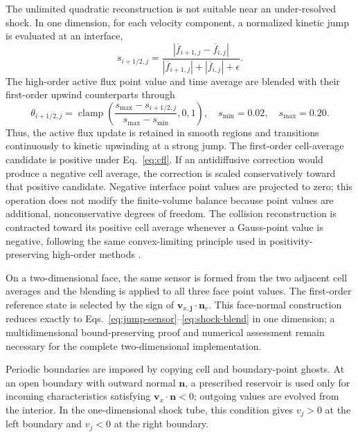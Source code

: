 \documentclass[preprint,3p,12pt]{elsarticle}
\newcommand{\vct}[1]{\boldsymbol{#1}}
\newcommand{\avg}[1]{\overline{#1}}
\begin{document}
The unlimited quadratic reconstruction is not suitable near an under-resolved shock. In one dimension, for each velocity component, a normalized kinetic jump is evaluated at an interface,
\begin{equation}
  s_{i+1/2,j}
  = \frac{|\avg{f}_{i+1,j}-\avg{f}_{i,j}|}
  {|\avg{f}_{i+1,j}|+|\avg{f}_{i,j}|+\epsilon}.
  \label{eq:jump-sensor}
\end{equation}
The high-order active flux point value and time average are blended with their first-order upwind counterparts through
\begin{equation}
  \theta_{i+1/2,j}
  = \operatorname{clamp}\left(
  \frac{s_{\max}-s_{i+1/2,j}}{s_{\max}-s_{\min}},0,1\right),
  \quad s_{\min}=0.02,
  \quad s_{\max}=0.20.
  \label{eq:shock-blend}
\end{equation}
Thus, the active flux update is retained in smooth regions and transitions continuously to kinetic upwinding at a strong jump. The first-order cell-average candidate is positive under Eq.~\eqref{eq:cfl}. If an antidiffusive correction would produce a negative cell average, the correction is scaled conservatively toward that positive candidate. Negative interface point values are projected to zero; this operation does not modify the finite-volume balance because point values are additional, nonconservative degrees of freedom. The collision reconstruction is contracted toward its positive cell average whenever a Gauss-point value is negative, following the same convex-limiting principle used in positivity-preserving high-order methods \cite{hu2013positivity,kiechle2025positivity}.

On a two-dimensional face, the same sensor is formed from the two adjacent cell averages and the blending is applied to all three face point values. The first-order reference state is selected by the sign of $\vct{v}_{x,\vct{j}}\cdot\vct{n}_e$. This face-normal construction reduces exactly to Eqs.~\eqref{eq:jump-sensor}--\eqref{eq:shock-blend} in one dimension; a multidimensional bound-preserving proof and numerical assessment remain necessary for the complete two-dimensional implementation.

Periodic boundaries are imposed by copying cell and boundary-point ghosts. At an open boundary with outward normal $\vct{n}$, a prescribed reservoir is used only for incoming characteristics satisfying $\vct{v}_x\cdot\vct{n}<0$; outgoing values are evolved from the interior. In the one-dimensional shock tube, this condition gives $v_j>0$ at the left boundary and $v_j<0$ at the right boundary.
\end{document}
